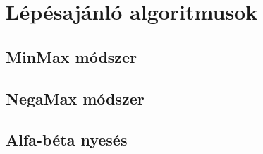 \section{Lépésajánló algoritmusok}

\subsection{MinMax módszer}

\subsection{NegaMax módszer}

\subsection{Alfa-béta nyesés}
